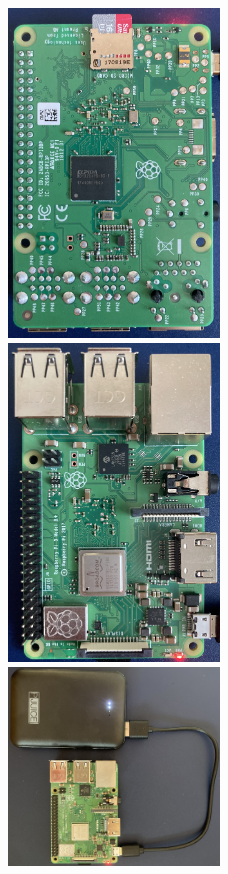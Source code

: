 \documentclass[a4paper]{article}
\begin{document}
\begin{figure}
    \includegraphics[width=0.5\textwidth]{images/hardware/Raspberry3.jpg}
    \includegraphics[width=0.5\textwidth]{images/hardware/Raspberry2.jpg}
    \includegraphics[width=0.5\textwidth]{images/hardware/Raspberry1.jpg}

\end{figure}
\end{document}
